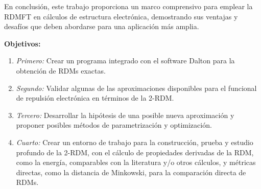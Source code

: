 En conclusión, este trabajo proporciona un marco comprensivo para emplear la 
RDMFT en cálculos de estructura electrónica, demostrando sus ventajas 
y desafíos que deben abordarse para una aplicación más amplia.

\vspace{0.3cm}
\textbf{Objetivos:}
\begin{enumerate}[label={}]
    \item \textit{Primero:} Crear un programa integrado con el software Dalton 
        para la obtención de RDMs exactas.
    \item \textit{Segundo:} Validar algunas de las aproximaciones disponibles
        para el funcional de repulsión electrónica en términos de la 2-RDM.
    \item \textit{Tercero:} Desarrollar la hipótesis de una posible nueva 
        aproximación y proponer posibles métodos de parametrización y optimización.
    \item \textit{Cuarto:} Crear un entorno de trabajo para la construcción, prueba y 
        estudio profundo de la 2-RDM, con el cálculo de propiedades derivadas 
        de la RDM, como la energía, comparables con la literatura y/o otros cálculos, 
        y métricas directas, como la distancia de Minkowski, para 
        la comparación directa de RDMs.
\end{enumerate}

